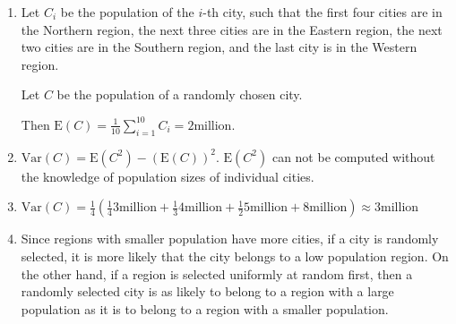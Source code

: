 \begin{enumerate}[label=(\alph*)]
\item Let $C_{i}$ be the population of the $i$-th city, such that the first four
cities are in the Northern region, the next three cities are in the Eastern
region, the next two cities are in the Southern region, and the last city is in
the Western region.

Let $C$ be the population of a randomly chosen city.

Then $\text{E}(C) = \frac{1}{10}\sum_{i=1}^{10}C_{i} = 2 \text{million}.$

\item $\text{Var}(C) = \text{E}(C^{2}) - (\text{E}(C))^{2}$. $\text{E}(C^{2})$
can not be computed without the knowledge of population sizes of individual
cities.

\item $\text{Var}(C) = \frac{1}{4}(\frac{1}{4}3 \text{million} + \frac{1}{3}4
\text{million} + \frac{1}{2}5 \text{million} + 8 \text{million}) \approx 3 
\text{million}$

\item Since regions with smaller population have more cities, if a city is
randomly selected, it is more likely that the city belongs to a low population
region. On the other hand, if a region is selected uniformly at random first,
then a randomly selected city is as likely to belong to a region with a large
population as it is to belong to a region with a smaller population.
\end{enumerate}